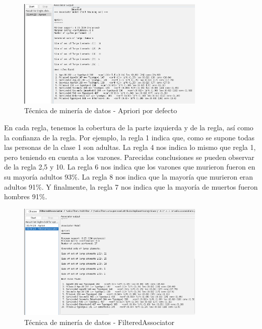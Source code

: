 \documentclass[12pt]{article}
\begin{document}
\begin{itemize}
                        \begin{figure}[!h]
                            \centering
                            \includegraphics[width=0.8\textwidth]{img/weka-16.png}
                            \caption{Técnica de minería de datos - Apriori por defecto}
                        \end{figure}

                        En cada regla, tenemos la cobertura de la parte izquierda y de la regla, así como la confianza de la regla. Por ejemplo, la regla 1 indica que, como se supone todas las personas de la clase 1 son adultas. La regla 4 nos indica lo mismo que regla 1, pero teniendo en cuenta a los varones. Parecidas conclusiones se pueden observar de la regla 2,5 y 10. La regla 6 nos indica que los varones que murieron fueron en su mayoría adultos 93\%. La regla 8 nos indica que la mayoría que murieron eran adultos 91\%. Y finalmente, la regla 7 nos indica que la mayoría de muertos fueron hombres 91\%.

                        \begin{figure}[!h]
                            \centering
                            \includegraphics[width=0.8\textwidth]{img/weka-17.png}
                            \caption{Técnica de minería de datos - FilteredAssociator}
                        \end{figure}


\end{itemize}
\end{document}
